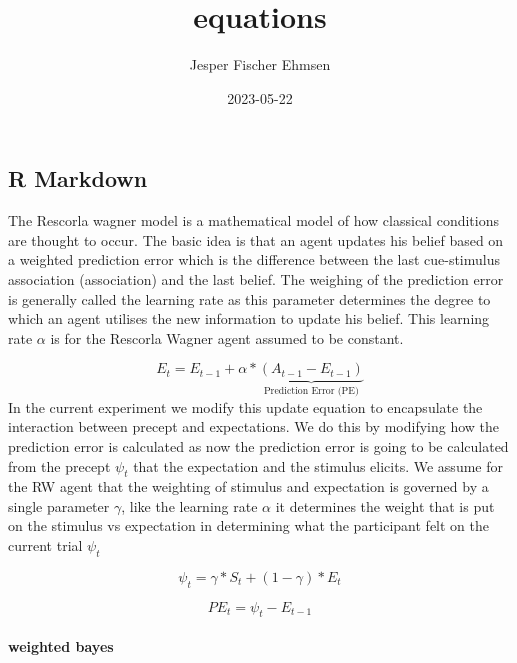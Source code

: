 \documentclass[
]{article}
\title{equations}
\author{Jesper Fischer Ehmsen}
\date{2023-05-22}
\begin{document}
\maketitle

\hypertarget{r-markdown}{%
\subsection{R Markdown}\label{r-markdown}}

The Rescorla wagner model is a mathematical model of how classical
conditions are thought to occur. The basic idea is that an agent updates
his belief based on a weighted prediction error which is the difference
between the last cue-stimulus association (association) and the last
belief. The weighing of the prediction error is generally called the
learning rate as this parameter determines the degree to which an agent
utilises the new information to update his belief. This learning rate
\(\alpha\) is for the Rescorla Wagner agent assumed to be constant.

\[
\begin{equation}
\tag{1}
E_t = E_{t-1}+\alpha*\underbrace{(A_{t-1}-E_{t-1})}_{\text{Prediction Error (PE)}}
\end{equation}
\] In the current experiment we modify this update equation to
encapsulate the interaction between precept and expectations. We do this
by modifying how the prediction error is calculated as now the
prediction error is going to be calculated from the precept \(\psi_t\)
that the expectation and the stimulus elicits. We assume for the RW
agent that the weighting of stimulus and expectation is governed by a
single parameter \(\gamma\), like the learning rate \(\alpha\) it
determines the weight that is put on the stimulus vs expectation in
determining what the participant felt on the current trial \(\psi_t\)

\[
\begin{equation}
\tag{2}
\psi_t = \gamma*S_t+(1-\gamma)*E_t
\end{equation}
\]

\[
\begin{equation}
\tag{3}
PE_t = \psi_t-E_{t-1}
\end{equation}
\]

\hypertarget{weighted-bayes}{%
\paragraph{weighted bayes}\label{weighted-bayes}}
\end{document}
